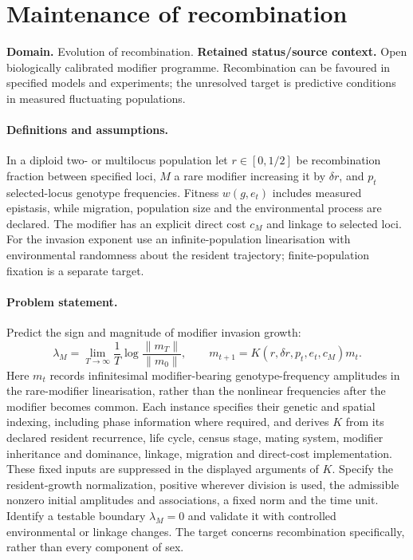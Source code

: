 \documentclass[11pt]{article}
\begin{document}
\section*{Maintenance of recombination}
\label{prob:145}
\label{rank:149}
\par\smallskip

\noindent\textbf{Domain.} Evolution of recombination. \quad \textbf{Retained status/source context.} Open biologically calibrated modifier programme. Recombination can be favoured in specified models and experiments; the unresolved target is predictive conditions in measured fluctuating populations.
\paragraph{Definitions and assumptions.} In a diploid two- or multilocus population let $r\in[0,1/2]$ be recombination fraction between specified loci, $M$ a rare modifier increasing it by $\delta r$, and $p_t$ selected-locus genotype frequencies. Fitness $w(g,e_t)$ includes measured epistasis, while migration, population size and the environmental process are declared. The modifier has an explicit direct cost $c_M$ and linkage to selected loci. For the invasion exponent use an infinite-population linearisation with environmental randomness about the resident trajectory; finite-population fixation is a separate target.
\paragraph{Problem statement.} Predict the sign and magnitude of modifier invasion growth:
\[
\lambda_M=\lim_{T\to\infty}\frac1T\log\frac{\|m_T\|}{\|m_0\|},
\qquad
m_{t+1}=K(r,\delta r,p_t,e_t,c_M)m_t.
\]
Here $m_t$ records infinitesimal modifier-bearing genotype-frequency amplitudes in the rare-modifier linearisation, rather than the nonlinear frequencies after the modifier becomes common. Each instance specifies their genetic and spatial indexing, including phase information where required, and derives $K$ from its declared resident recurrence, life cycle, census stage, mating system, modifier inheritance and dominance, linkage, migration and direct-cost implementation. These fixed inputs are suppressed in the displayed arguments of $K$. Specify the resident-growth normalization, positive wherever division is used, the admissible nonzero initial amplitudes and associations, a fixed norm and the time unit. Identify a testable boundary $\lambda_M=0$ and validate it with controlled environmental or linkage changes. The target concerns recombination specifically, rather than every component of sex.
\end{document}
